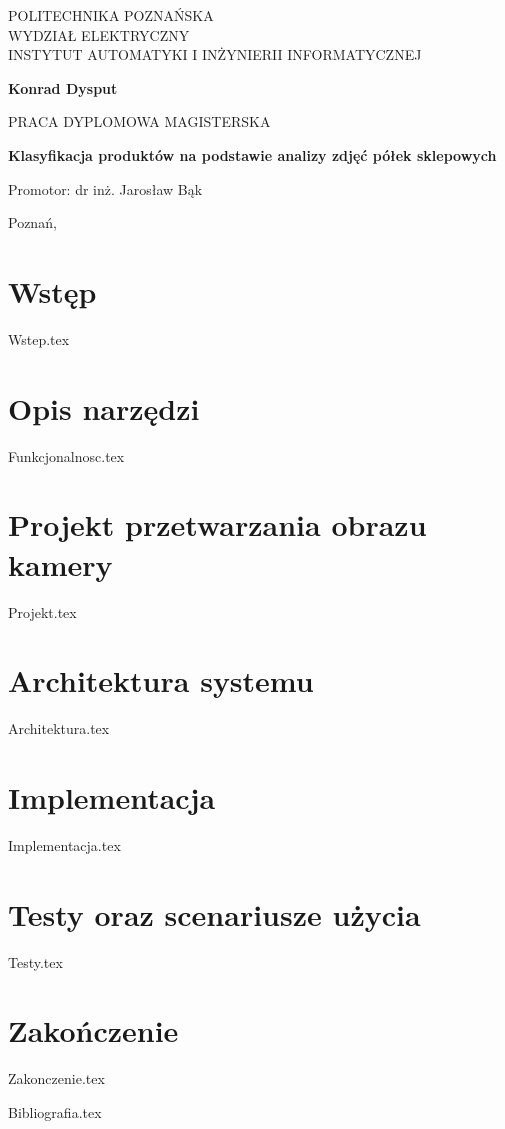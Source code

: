 \documentclass[12pt,a4paper,leqno,oneside,titlepage]{mwrep}
\begin{document}
\begin{titlepage}
\begin{center}
{\large POLITECHNIKA POZNAŃSKA\\ WYDZIAŁ ELEKTRYCZNY\\ INSTYTUT AUTOMATYKI I INŻYNIERII INFORMATYCZNEJ\par}
\end{center}
\vspace{1.5cm plus 1fill}
\begin{center}
{\bf \Large Konrad Dysput\par}
\end{center}
\vspace{1.5cm plus 1mm minus 2mm}
\begin{center}
{\large PRACA DYPLOMOWA MAGISTERSKA\par}
\end{center}
\vspace{1.5cm plus 1mm minus 2mm}
\begin{center}
{\huge\textbf{Klasyfikacja produktów na podstawie analizy zdjęć półek sklepowych }\par}
\vspace{1.5cm plus 1.5fill}
\begin{flushright}
{\large Promotor: dr inż. Jarosław Bąk}
\end{flushright}
\vspace{4cm plus .1fill}
{\large Poznań,\par}
\end{center}
\end{titlepage}

\tableofcontents

\chapter{Wstęp}
{Wstep.tex}

\chapter{Opis narzędzi}
{Funkcjonalnosc.tex}

\chapter{Projekt przetwarzania obrazu kamery}
{Projekt.tex}

\chapter{Architektura systemu}
{Architektura.tex}

\chapter{Implementacja}
{Implementacja.tex}

\chapter{Testy oraz scenariusze użycia}
{Testy.tex}

\chapter{Zakończenie}
{Zakonczenie.tex}

{Bibliografia.tex}
\end{document}
